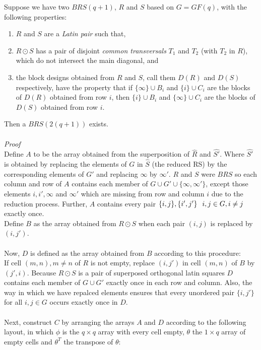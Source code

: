 \documentclass[
  12pt,
  a4paper]{book}
\begin{document}
Suppose we have two \(BRS(q+1)\), \(R\) and \(S\) based on \(G = GF(q)\), with
the following properties:

\begin{enumerate}
\def\labelenumi{\arabic{enumi}.}
\item
  \(R\) and \(S\) are a \emph{Latin pair} such that,
\item
  \(R \odot S\) has a pair of disjoint \emph{common transversals} \(T_1\) and
  \(T_2\) (with \(T_2\) in \(R\)), which do not intersect the main diagonal,
  and
\item
  the block designs obtained from \(R\) and \(S\), call them \(D(R)\) and
  \(D(S)\) respectively, have the property that if \(\{\infty\} \cup B_i\)
  and \(\{i\} \cup C_i\) are the blocks of \(D(R)\) obtained from row \(i\),
  then \(\{i\} \cup B_i\) and \(\{\infty\} \cup C_i\) are the blocks of
  \(D(S)\) obtained from row \(i\).
\end{enumerate}

Then a \(BRS(2(q+1))\) exists.\\
~\\
\emph{Proof}\\
Define \(A\) to be the array obtained from the superposition of \(\hat{R}\)
and \(\hat{S'}\). Where \(\hat{S'}\) is obtained by replacing the elements
of \(G\) in \(\hat{S}\) (the reduced RS) by the corresponding elements of
\(G'\) and replacing \(\infty\) by \(\infty'\). \(R\) and \(S\) were \(BRS\) so each
column and row of \(A\) contains each member of
\(G \cup G' \cup \{\infty,\infty'\}\), except those elements \(i,i',\infty\)
and \(\infty'\) which are missing from row and column \(i\) due to the
reduction process. Further, \(A\) contains every pair
\(\{i,j\},\{i',j'\} \hspace{0.25cm} i,j \in G,i \neq j\) exactly once.\\
Define \(B\) as the array obtained from \(R \odot S\) when each pair \((i,j)\)
is replaced by \((i,j')\).\\
~\\
Now, \(D\) is defined as the array obtained from \(B\) according to this
procedure:\\
If cell \((m,n), m\neq n\) of \(R\) is not empty, replace \((i,j')\) in cell
\((m,n)\) of \(B\) by \((j',i)\). Because \(R \odot S\) is a pair of superposed
orthogonal latin squares \(D\) contains each member of \(G \cup G'\) exactly
once in each row and column. Also, the way in which we have repalced
elements ensures that every unordered pair \(\{i,j'\}\) for all
\(i,j \in G\) occurs exactly once in \(D\).\\
~\\
Next, construct \(C\) by arranging the arrays \(A\) and \(D\) according to the
following layout, in which \(\phi\) is the \(q \times q\) array with every
cell empty, \(\theta\) the \(1 \times q\) array of empty cells and
\(\theta ^T\) the transpose of \(\theta\):
\end{document}
